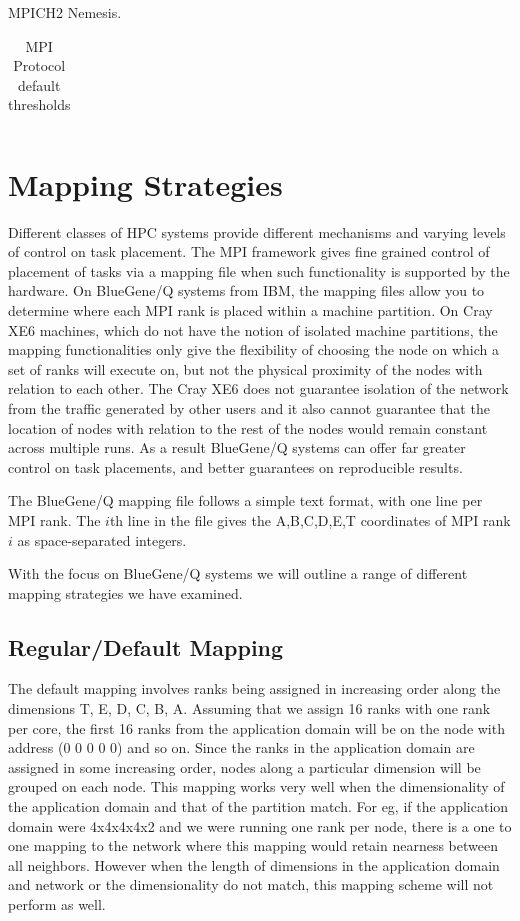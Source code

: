 \documentclass{acm_proc_article-sp}
\begin{document}
MPICH2 Nemesis.

\begin{table}
  \caption{MPI Protocol default thresholds
    \label{table:bgq_protocols}}
  {\footnotesize
    \begin{tabular}{ | l | l | l | p{1.5cm} |}
    \hline 
    
    \end{tabular}
  }
\end{table}

\section{Mapping Strategies}\label{sect:mapping}
Different classes of HPC systems provide different mechanisms and varying levels of control on task placement.
The MPI framework gives fine grained control of placement of tasks via a mapping file when such functionality
is supported by the hardware. On BlueGene/Q systems from IBM, the mapping files allow you to determine where
each MPI rank is placed within a machine partition. On Cray XE6 machines, which do not have the notion of
isolated machine partitions, the mapping functionalities only give the flexibility of choosing the node on
which a set of ranks will execute on, but not the physical proximity of the nodes with relation to each other.
The Cray XE6 does not guarantee isolation of the network from the traffic generated by other users and it
also cannot guarantee that the location of nodes with relation to the rest of the nodes would remain constant
across multiple runs. As a result BlueGene/Q systems can offer far greater control on task placements, and
better guarantees on reproducible results.

The BlueGene/Q mapping file follows a simple text format, with one
line per MPI rank.  The $i$th line in the file gives the A,B,C,D,E,T
coordinates of MPI rank $i$ as space-separated integers.

With the focus on BlueGene/Q systems we will outline a range of different mapping strategies we have examined.

\subsection{Regular/Default Mapping}
The default mapping involves ranks being assigned in increasing order along the dimensions T, E, D, C, B, A.
Assuming that we assign 16 ranks with one rank per core, the first 16 ranks from the application domain will
be on the node with address (0 0 0 0 0) and so on. Since the ranks in the application domain are assigned in
some increasing order, nodes along a particular dimension will be grouped on each node. This mapping works
very well when the dimensionality of the application domain and that of the partition match. For eg, if the
application domain were 4x4x4x4x2 and we were running one rank per node, there is a one to one mapping to the
network where this mapping would retain nearness between all neighbors. However when the length of dimensions
in the application domain and network or the dimensionality do not match, this mapping scheme will not perform as well.
\end{document}
